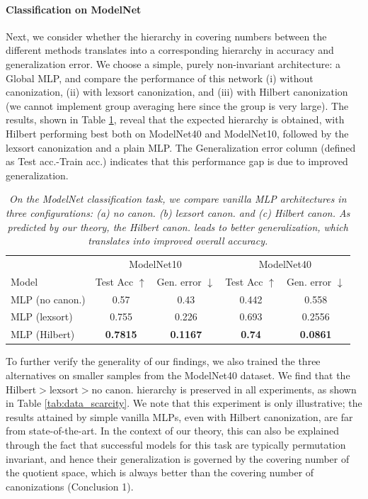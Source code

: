 \documentclass{article}
\theoremstyle{definition}
\theoremstyle{plain}
\begin{document}
\paragraph{Classification on ModelNet} Next, we consider whether the hierarchy in covering numbers between the different methods translates into a corresponding hierarchy in accuracy and generalization error. We choose a simple, purely non-invariant architecture: a Global MLP, and compare the performance of this network (i) without canonization, (ii) with lexsort canonization, and (iii) with Hilbert canonization (we cannot implement group averaging here since the group is very large). The results, shown in Table \ref{tab:best_modelnet10and40}, reveal that the expected hierarchy is obtained, with Hilbert performing best both on ModelNet40 and ModelNet10, followed by the lexsort canonization and a plain MLP. The Generalization error column (defined as Test acc.-Train acc.) indicates that this performance gap is due to improved generalization.  

\begin{table}[h]
\centering
\caption{\it On the ModelNet classification task, we compare vanilla MLP architectures in three configurations: (a) no canon. (b) lexsort canon. and (c) Hilbert canon. As predicted by our theory, the Hilbert canon. leads to better generalization, which translates into improved overall accuracy.}
\label{tab:best_modelnet10and40}
\begin{tabular}{lcccc}
\hline
 & \multicolumn{2}{c}{ModelNet10} & \multicolumn{2}{c}{ModelNet40} \\
Model & Test Acc $\uparrow$ & Gen. error $\downarrow$ & Test Acc $\uparrow$ & Gen. error $\downarrow$ \\
\hline
MLP (no canon.)  & 0.57 & 0.43 & 0.442 & 0.558 \\
MLP (lexsort)    & 0.755 & 0.226 & 0.693 & 0.2556 \\
MLP (Hilbert)    & \textbf{0.7815} & \textbf{0.1167} & \textbf{0.74} & \textbf{0.0861} \\
\hline
\end{tabular}
\end{table}

To further verify the generality of our findings, we also trained the three alternatives on smaller samples from the ModelNet40 dataset. We find that the $\text{Hilbert}>\text{lexsort}>\text{no canon.}$ hierarchy is preserved in all experiments, as shown in Table \ref{tab:data_scarcity}. 
We note that this experiment is only illustrative; the results attained by simple vanilla MLPs, even with Hilbert canonization, are far from state-of-the-art. In the context of our theory, this can also be explained through the fact that successful models for this task are typically permutation invariant, and hence their generalization is governed by the covering number of the quotient space, which is always better than the covering number of canonizations (Conclusion 1).
\end{document}
